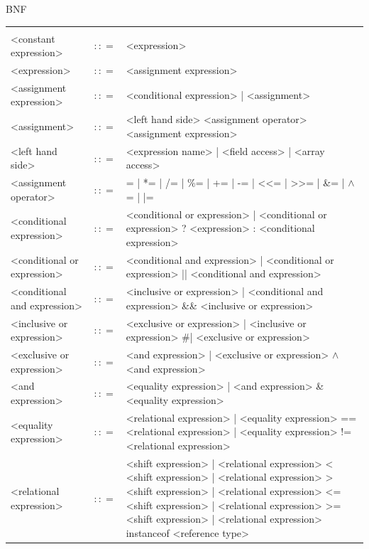 \documentclass[landscape, 11pt]{article}
\begin{document}
\begin{qsection}{BNF}
\begin{enumerate}[label=\bt{\theenumi.}]

			\begin{longtable}{R{7cm} c L{15cm}}
													&					&	 \\
				<constant expression>						&	$\colon\colon=$	&	<expression>
				\\
				<expression>								&	$\colon\colon=$	&	<assignment expression>
				\\
				<assignment expression>						&	$\colon\colon=$	&	<conditional expression> | <assignment>
				\\
				<assignment>								&	$\colon\colon=$	&	<left hand side> <assignment operator> <assignment expression>
				\\
				<left hand side>							&	$\colon\colon=$	&	<expression name> | <field access> | <array access>
				\\
				<assignment operator>						&	$\colon\colon=$	&	= | *= | /= | \%= | += | -= | <<= | >>= | \&= | $\wedge$= | |=
				\\
				<conditional expression>					&	$\colon\colon=$	&	<conditional or expression> | <conditional or expression> ? <expression> : <conditional expression>
				\\
				<conditional or expression>					&	$\colon\colon=$	&	<conditional and expression> | <conditional or expression> || <conditional and expression>
				\\
				<conditional and expression>				&	$\colon\colon=$	&	<inclusive or expression> | <conditional and expression> \&\& <inclusive or expression>
				\\
				<inclusive or expression>					&	$\colon\colon=$	&	<exclusive or expression> | <inclusive or expression> \#| <exclusive or expression>
				\\
				<exclusive or expression>					&	$\colon\colon=$	&	<and expression> | <exclusive or expression> $\wedge$ <and expression>
				\\
				<and expression>							&	$\colon\colon=$	&	<equality expression> | <and expression> \& <equality expression>
				\\
				<equality expression>						&	$\colon\colon=$	&	<relational expression> | <equality expression> == <relational expression> | <equality expression> != <relational expression>
				\\
				<relational expression>						&	$\colon\colon=$	&	<shift expression> | <relational expression> < <shift expression> | <relational expression> > <shift expression> | <relational expression> <= <shift expression> | <relational expression> >= <shift expression> | <relational expression> instanceof <reference type>

\end{longtable}
\end{enumerate}
\end{qsection}
\end{document}
